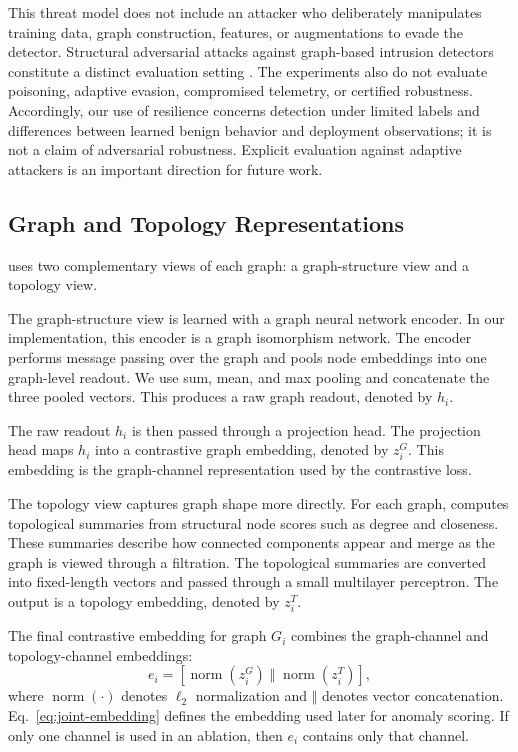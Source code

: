 This threat model does not include an attacker who deliberately manipulates training data, graph construction, features, or augmentations to evade the detector. Structural adversarial attacks against graph-based intrusion detectors constitute a distinct evaluation setting \cite{venturi2024structuralattacks}. The experiments also do not evaluate poisoning, adaptive evasion, compromised telemetry, or certified robustness. Accordingly, our use of resilience concerns detection under limited labels and differences between learned benign behavior and deployment observations; it is not a claim of adversarial robustness. Explicit evaluation against adaptive attackers is an important direction for future work.

\subsection{Graph and Topology Representations}

\sysname{} uses two complementary views of each graph: a graph-structure view and a topology view.

The graph-structure view is learned with a graph neural network encoder. In our implementation, this encoder is a graph isomorphism network. The encoder performs message passing over the graph and pools node embeddings into one graph-level readout. We use sum, mean, and max pooling and concatenate the three pooled vectors. This produces a raw graph readout, denoted by $h_i$.

The raw readout $h_i$ is then passed through a projection head. The projection head maps $h_i$ into a contrastive graph embedding, denoted by $z_i^{G}$. This embedding is the graph-channel representation used by the contrastive loss.

The topology view captures graph shape more directly. For each graph, \sysname{} computes topological summaries from structural node scores such as degree and closeness. These summaries describe how connected components appear and merge as the graph is viewed through a filtration. The topological summaries are converted into fixed-length vectors and passed through a small multilayer perceptron. The output is a topology embedding, denoted by $z_i^{T}$.

The final contrastive embedding for graph $G_i$ combines the graph-channel and topology-channel embeddings:
\begin{equation}
    e_i =
    \left[
    \operatorname{norm}(z_i^{G})
    \; \Vert \;
    \operatorname{norm}(z_i^{T})
    \right],
    \label{eq:joint-embedding}
\end{equation}
where $\operatorname{norm}(\cdot)$ denotes $\ell_2$ normalization and $\Vert$ denotes vector concatenation. Eq.~\eqref{eq:joint-embedding} defines the embedding used later for anomaly scoring. If only one channel is used in an ablation, then $e_i$ contains only that channel.

